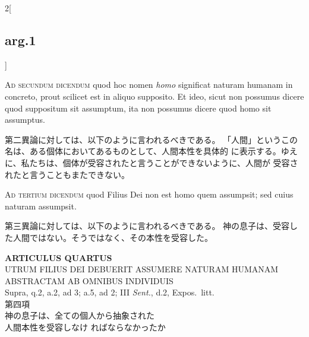 \documentclass[paper=a4paper,fontsize=10pt,jafontsize=9pt,titlepage]{jlreq}
\begin{document}
\begin{paracol}{2}[\subsection{arg.1}]
\switchcolumn*[\subsection{ad.2}]

{\scshape Ad secundum dicendum} quod hoc nomen {\itshape homo} significat naturam humanam in
concreto, prout scilicet est in aliquo supposito. Et ideo, sicut non
possumus dicere quod suppositum sit assumptum, ita non possumus dicere
quod homo sit assumptus.

\switchcolumn

第二異論に対しては、以下のように言われるべきである。
「人間」というこの名は、ある個体においてあるものとして、人間本性を具体的
 に表示する。ゆえに、私たちは、個体が受容されたと言うことができないように、人間が
 受容されたと言うこともまたできない。

\switchcolumn*[\subsection{ad.3}]

{\scshape Ad tertium dicendum} quod Filius Dei non est homo quem assumpsit; sed
cuius naturam assumpsit.

\switchcolumn

第三異論に対しては、以下のように言われるべきである。
神の息子は、受容した人間ではない。そうではなく、その本性を受容した。

\end{paracol}
\newpage





{}
\setcounter{section}{4}
\setcounter{subsection}{0}
\begin{center}
 {\Large {\bfseries ARTICULUS QUARTUS}}\\
 {\large UTRUM FILIUS DEI DEBUERIT ASSUMERE NATURAM HUMANAM\\ABSTRACTAM
 AB OMNIBUS INDIVIDUIS}\\
 {\footnotesize Supra, q.2, a.2, ad 3; a.5, ad 2; III {\itshape Sent.},
 d.2, Expos.~litt.}\\
 {\Large 第四項\\神の息子は、全ての個人から抽象された\\人間本性を受容しなけ
 ればならなかったか}
\end{center}
\end{document}
